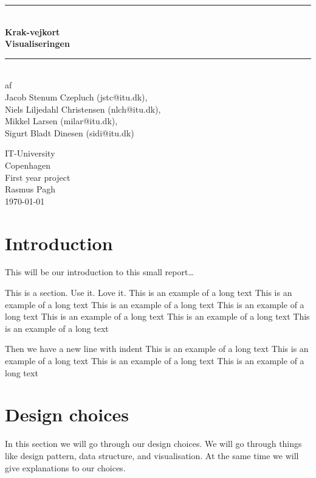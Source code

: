 \documentclass[a4paper,11pt]{article}
\begin{document}
\begin{titlepage}
\centering \parindent=0pt
\newcommand{\HRule}{\rule{\textwidth}{1mm}}
 \HRule\\[1cm]\Huge\bfseries
Krak-vejkort\\[0.7cm]
\large Visualiseringen\\[1cm]
\HRule\\[4cm]  \large af \\Jacob Stenum Czepluch (jstc@itu.dk), \\Niels Liljedahl Christensen (nlch@itu.dk), \\Mikkel Larsen (milar@itu.dk), \\Sigurt Bladt Dinesen (sidi@itu.dk) \\
 \normalsize %
\begin{flushleft}
IT-University\\
Copenhagen\\
First year project\\
Rasmus Pagh\\
\today \end{flushleft}
\end{titlepage}

\tableofcontents
\pagebreak

\pagebreak
\section{Introduction}

This will be our introduction to this small report\ldots


This is a section. Use it. Love it.
This is an example of a long text
This is an example of a long text
This is an example of a long text
This is an example of a long text
This is an example of a long text
This is an example of a long text
This is an example of a long text

Then we have a new line with indent
This is an example of a long text
This is an example of a long text
This is an example of a long text
This is an example of a long text

\pagebreak
\section{Design choices} %
\label{sec:Design choices}
In this section we will go through our design choices. We will go through things like design pattern, data structure, and visualisation.
At the same time we will give explanations to our choices.
\end{document}
